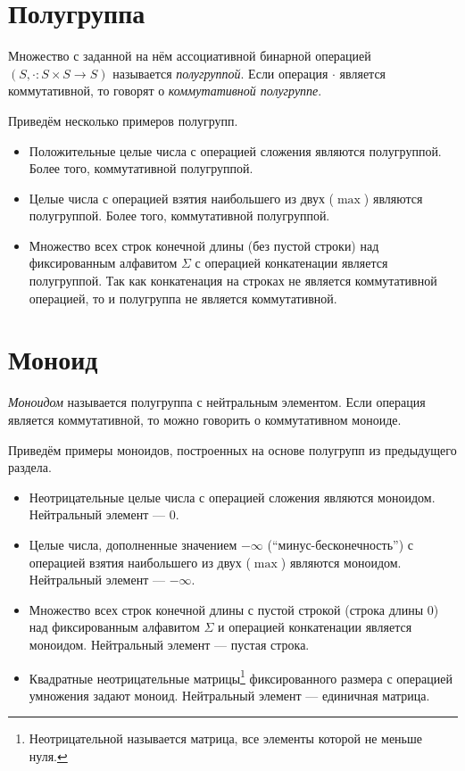 \section{Полугруппа}


\begin{definition}
Множество с заданной на нём ассоциативной бинарной операцией $(S,\cdot : S \times S \to S )$ называется \emph{полугруппой}.
Если операция $\cdot$ является коммутативной, то говорят о \textit{коммутативной полугруппе}.
\end{definition}


\begin{example} Приведём несколько примеров полугрупп.
\begin{itemize}
	\item Положительные целые числа с операцией сложения являются полугруппой. Более того, коммутативной полугруппой.
	\item Целые числа с операцией взятия наибольшего из двух ($\max$) являются полугруппой. Более того, коммутативной полугруппой.
	\item Множество всех строк конечной длины (без пустой строки) над фиксированным алфавитом $\Sigma$ с операцией конкатенации является полугруппой. Так как конкатенация на строках не является коммутативной операцией, то и полугруппа не является коммутативной.
\end{itemize}
\end{example}


\section{Моноид}


\begin{definition}
	\emph{Моноидом} называется полугруппа с нейтральным элементом. Если операция является коммутативной, то можно говорить о коммутативном моноиде.
\end{definition}

\begin{example} Приведём примеры моноидов, построенных на основе полугрупп из предыдущего раздела.

\begin{itemize}
	\item Неотрицательные целые числа с операцией сложения являются моноидом. Нейтральный элемент --- $0$.
	\item Целые числа, дополненные значением $-\infty$ (``минус-бесконечность'') с операцией взятия наибольшего из двух ($\max$) являются моноидом. Нейтральный элемент --- $-\infty$.
	\item Множество всех строк конечной длины с пустой строкой (строка длины 0) над фиксированным алфавитом $\Sigma$ и операцией конкатенации является моноидом. Нейтральный элемент --- пустая строка.
	\item Квадратные неотрицательные матрицы\footnote{Неотрицательной называется матрица, все элементы которой не меньше нуля.} фиксированного размера с операцией умножения задают моноид. Нейтральный элемент --- единичная матрица.
\end{itemize}
\end{example}


